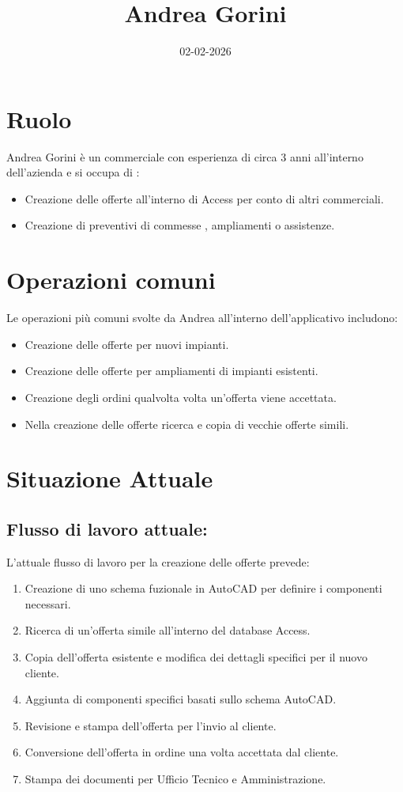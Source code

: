 \documentclass[12pt, a4paper]{article} %
\title{Andrea Gorini}
\date{02-02-2026}
\begin{document}
\maketitle

\section{Ruolo}
Andrea Gorini è un commerciale con esperienza di circa 3 anni all'interno
dell'azienda e si occupa di :
\begin{itemize}
    \item Creazione delle offerte all'interno di Access per conto di altri commerciali.
    \item Creazione di preventivi di commesse , ampliamenti o assistenze.
\end{itemize}

\section{Operazioni comuni}
Le operazioni più comuni svolte da Andrea all'interno dell'applicativo
includono:
\begin{itemize}
    \item Creazione delle offerte per nuovi impianti.
    \item Creazione delle offerte per ampliamenti di impianti esistenti.
    \item Creazione degli ordini qualvolta volta un'offerta viene accettata.
    \item Nella creazione delle offerte ricerca e copia di vecchie offerte simili.
\end{itemize}
\section{Situazione Attuale}

\subsection{Flusso di lavoro attuale:}
L'attuale flusso di lavoro per la creazione delle offerte prevede:
\begin{enumerate}
    \item Creazione di uno schema fuzionale in AutoCAD per definire i componenti
          necessari.
    \item Ricerca di un'offerta simile all'interno del database Access.
    \item Copia dell'offerta esistente e modifica dei dettagli specifici per il nuovo
          cliente.
    \item Aggiunta di componenti specifici basati sullo schema AutoCAD.
    \item Revisione e stampa dell'offerta per l'invio al cliente.
    \item Conversione dell'offerta in ordine una volta accettata dal cliente.
    \item Stampa dei documenti per Ufficio Tecnico e Amministrazione.
\end{enumerate}
\end{document}
